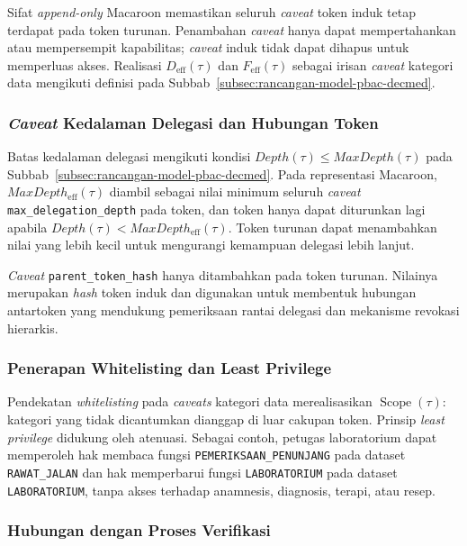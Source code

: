 Sifat \textit{append-only} Macaroon memastikan seluruh \textit{caveat} token induk tetap terdapat pada token turunan. Penambahan \textit{caveat} hanya dapat mempertahankan atau mempersempit kapabilitas; \textit{caveat} induk tidak dapat dihapus untuk memperluas akses. Realisasi $D_{\operatorname{eff}}(\tau)$ dan $F_{\operatorname{eff}}(\tau)$ sebagai irisan \textit{caveat} kategori data mengikuti definisi pada Subbab~\ref{subsec:rancangan-model-pbac-decmed}.

\subsubsection{\textit{Caveat} Kedalaman Delegasi dan Hubungan Token}

Batas kedalaman delegasi mengikuti kondisi $Depth(\tau)\leq MaxDepth(\tau)$ pada Subbab~\ref{subsec:rancangan-model-pbac-decmed}. Pada representasi Macaroon, $MaxDepth_{\operatorname{eff}}(\tau)$ diambil sebagai nilai minimum seluruh \textit{caveat} \texttt{max\_delegation\_depth} pada token, dan token hanya dapat diturunkan lagi apabila $Depth(\tau)<MaxDepth_{\operatorname{eff}}(\tau)$. Token turunan dapat menambahkan nilai yang lebih kecil untuk mengurangi kemampuan delegasi lebih lanjut.

\textit{Caveat} \texttt{parent\_token\_hash} hanya ditambahkan pada token turunan. Nilainya merupakan \textit{hash} token induk dan digunakan untuk membentuk hubungan antartoken yang mendukung pemeriksaan rantai delegasi dan mekanisme revokasi hierarkis.

\subsubsection{Penerapan Whitelisting dan Least Privilege}

Pendekatan \textit{whitelisting} pada \textit{caveats} kategori data merealisasikan $\operatorname{Scope}(\tau)$: kategori yang tidak dicantumkan dianggap di luar cakupan token. Prinsip \textit{least privilege} didukung oleh atenuasi. Sebagai contoh, petugas laboratorium dapat memperoleh hak membaca fungsi \texttt{PEMERIKSAAN\_PENUNJANG} pada dataset \texttt{RAWAT\_JALAN} dan hak memperbarui fungsi \texttt{LABORATORIUM} pada dataset \texttt{LABORATORIUM}, tanpa akses terhadap anamnesis, diagnosis, terapi, atau resep.

\subsubsection{Hubungan dengan Proses Verifikasi}


